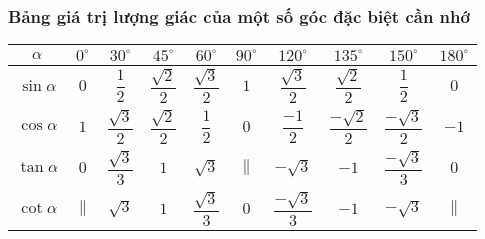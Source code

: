 \subsubsection{Bảng giá trị lượng giác của một số góc đặc biệt cần nhớ}
\begin{center}
	\renewcommand{\arraystretch}{2}%
	\begin{tabular}{|c|c|c|c|c|c|c|c|c|c|}
		\hline
		$\alpha$ & $0^\circ$ & $30^\circ$ & $45^\circ$ & $60^\circ$ & $90^\circ$ & $120^\circ$ & $135^\circ$ & $150^\circ$& $180^\circ$ \\
		\hline
		$\sin\alpha$& $0$ & $\dfrac{1}{2}$ & $\dfrac{\sqrt{2}}{2}$  &  $\dfrac{\sqrt{3}}{2}$ & $1$ & $\dfrac{\sqrt{3}}{2}$ & $\dfrac{\sqrt{2}}{2}$ & $\dfrac{1}{2}$ & $0$ \\
		\hline
		$\cos\alpha$& $1$ & $\dfrac{\sqrt{3}}{2}$ & $\dfrac{\sqrt{2}}{2}$  &  $\dfrac{1}{2}$& $0$& $\dfrac{-1}{2}$&$\dfrac{-\sqrt{2}}{2}$&$\dfrac{-\sqrt{3}}{2}$&$-1$ \\
		\hline
		$\tan\alpha$& $0$ & $\dfrac{\sqrt{3}}{3}$ & $1$  &  $\sqrt{3}$& $\parallel$& $-\sqrt{3}$&$-1$&$\dfrac{-\sqrt{3}}{3}$& $0$\\
		\hline
		$\cot\alpha$& $\parallel$ & $\sqrt{3}$ & $1$  &  $\dfrac{\sqrt{3}}{3}$& $0$& $\dfrac{-\sqrt{3}}{3}$&$-1$&$-\sqrt{3}$& $\parallel$\\
		\hline
	\end{tabular}
\end{center}

